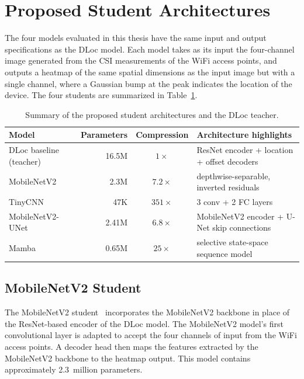 \section{Proposed Student Architectures}
\label{sec:method:students}

The four models evaluated in this thesis have the same input and output specifications as the DLoc
model. Each model takes as its input the four-channel image generated from the CSI measurements of the
WiFi access points, and outputs a heatmap of the same spatial dimensions as the input image but with a
single channel, where a Gaussian bump at the peak indicates the location of the device. The four
students are summarized in Table~\ref{tab:method:architectures}.

\begin{table}[H]
\centering
\footnotesize %
\setlength{\tabcolsep}{4pt} %
\caption{Summary of the proposed student architectures and the DLoc teacher.}
\label{tab:method:architectures}
\begin{tabular}{@{}lrcl@{}}
\toprule
\textbf{Model} & \textbf{Parameters} & \textbf{Compression} & \textbf{Architecture highlights} \\
\midrule
DLoc baseline (teacher) & 16.5M & $1\times$ & ResNet encoder + location + offset decoders \\
MobileNetV2 & 2.3M & $7.2\times$ & depthwise-separable, inverted residuals \\
TinyCNN & 47K & $351\times$ & 3 conv + 2 FC layers \\
MobileNetV2-UNet & 2.41M & $6.8\times$ & MobileNetV2 encoder + U-Net skip connections \\
Mamba & 0.65M & $25\times$ & selective state-space sequence model \\
\bottomrule
\end{tabular}
\end{table}

\subsection{MobileNetV2 Student}
\label{sec:method:mobilenet}

The MobileNetV2 student~\cite{sandler2018mobilenetv2} incorporates the MobileNetV2 backbone in place of
the ResNet-based encoder of the DLoc model. The MobileNetV2 model's first convolutional layer is adapted
to accept the four channels of input from the WiFi access points. A decoder head then maps the features
extracted by the MobileNetV2 backbone to the heatmap output. This model contains approximately
2.3~million parameters.

